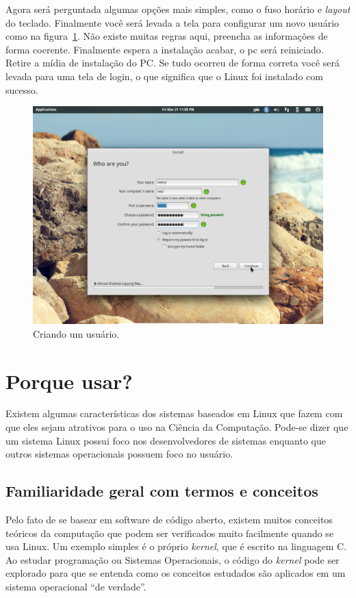 \documentclass{handout_utfpr}
\begin{document}
Agora será perguntada algumas opções mais simples, como o fuso horário e \textit{layout} do teclado. Finalmente você será levada a tela para configurar um novo usuário como na figura~\ref{fig:elementary-info}. Não existe muitas regras aqui, preencha as informações de forma coerente. Finalmente espera a instalação acabar, o pc será reiniciado. Retire a mídia de instalação do PC\@. Se tudo ocorreu de forma correta você será levada para uma tela de login, o que significa que o Linux foi instalado com sucesso.

\begin{figure}[H]
  \centering
  \includegraphics[scale=.3]{imagens/elementary-install-10.png}
  \caption{Criando um usuário.}
  \label{fig:elementary-info}
\end{figure}

\section{Porque usar?}
Existem algumas características dos sistemas baseados em Linux que fazem com que eles sejam atrativos para o uso na Ciência da Computação. Pode-se dizer que um sistema Linux possui foco nos desenvolvedores de sistemas enquanto que outros sistemas operacionais possuem foco no usuário.

\subsection{Familiaridade geral com termos e conceitos}
Pelo fato de se basear em software de código aberto, existem muitos conceitos teóricos da computação que podem ser verificados muito facilmente quando se usa Linux. Um exemplo simples é o próprio \textit{kernel}, que é escrito na linguagem C. Ao estudar programação ou Sistemas Operacionais, o código do \textit{kernel} pode ser explorado para que se entenda como os conceitos estudados são aplicados em um sistema operacional ``de verdade''.
\end{document}

